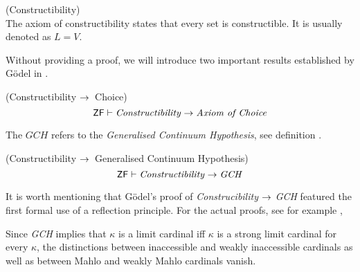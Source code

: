\begin{definition}{(Constructibility)}\\
The axiom of constructibility states that every set is constructible. It is usually denoted as $L = V$.
\end{definition}

Without providing a proof, we will introduce two important results established by Gödel in \cite{Godel1940consistency}. 

\begin{theorem}{(Constructibility $\rightarrow$ Choice)}
\begin{equation}
\sf{ZF} \vdash \mbox{\emph{Constructibility}} \rightarrow \mbox{\emph{Axiom of Choice}} 
\end{equation}
\end{theorem}

The $GCH$ refers to the \emph{Generalised Continuum Hypothesis}, see definition .
\begin{theorem}{(Constructibility $\rightarrow$ Generalised Continuum Hypothesis)}\label{theorem:l_then_gch}
\begin{equation}
\sf{ZF} \vdash \mbox{\emph{Constructibility}} \rightarrow \mbox{\emph{GCH}} 
\end{equation}
\end{theorem}
It is worth mentioning that Gödel's proof of \emph{Construcibility} $\rightarrow$ \emph{GCH} featured the first formal use of a reflection principle. 
For the actual proofs, see for example \cite{Kunen_independence},

Since \emph{GCH} implies that $\kappa$ is a limit cardinal iff $\kappa$ is a strong limit cardinal for every $\kappa$, the distinctions between inaccessible and weakly inaccessible cardinals as well as between Mahlo and weakly Mahlo cardinals vanish.


